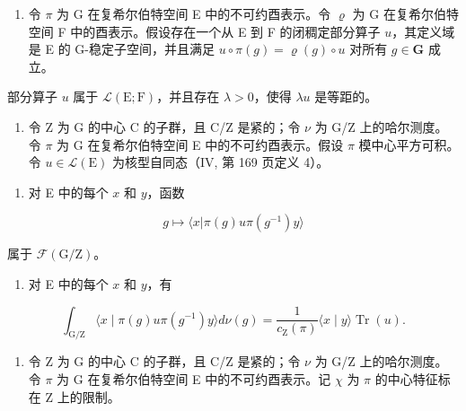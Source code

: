 \begin{enumerate}
\def\labelenumi{\arabic{enumi})}
\setcounter{enumi}{12}
\tightlist
\item
  令 \(\pi\) 为 G 在复希尔伯特空间 E 中的不可约酉表示。令 \(\varrho\) 为 G 在复希尔伯特空间 F 中的酉表示。假设存在一个从 E 到 F 的闭稠定部分算子 \(u\)，其定义域是 E 的 G-稳定子空间，并且满足 \(u \circ \pi(g) = \varrho(g) \circ u\) 对所有 \(g \in \mathbf{G}\) 成立。
\end{enumerate}

部分算子 \(u\) 属于 \(\mathcal{L}(\mathrm{E};\mathrm{F})\)，并且存在 \(\lambda > 0\)，使得 \(\lambda u\) 是等距的。

\begin{enumerate}
\def\labelenumi{\arabic{enumi})}
\setcounter{enumi}{13}
\tightlist
\item
  令 Z 为 G 的中心 C 的子群，且 C/Z 是紧的；令 \(\nu\) 为 G/Z 上的哈尔测度。令 \(\pi\) 为 G 在复希尔伯特空间 E 中的不可约酉表示。假设 \(\pi\) 模中心平方可积。令 \(u \in \mathcal{L}(\mathrm{E})\) 为核型自同态（IV, 第 169 页定义 4）。
\end{enumerate}

\begin{enumerate}
\def\labelenumi{\alph{enumi})}
\tightlist
\item
  对 E 中的每个 \(x\) 和 \(y\)，函数
\end{enumerate}

\[
g \mapsto \langle x | \pi (g) u \pi (g ^ {- 1}) y \rangle
\]

属于 \(\mathcal{F}(\mathrm{G / Z})\)。

\begin{enumerate}
\def\labelenumi{\alph{enumi})}
\setcounter{enumi}{1}
\tightlist
\item
  对 E 中的每个 \(x\) 和 \(y\)，有
\end{enumerate}

\[
\int_ {\mathrm{G} / \mathrm{Z}} \langle x \mid \pi (g) u \pi (g ^ {- 1}) y \rangle d \nu (g) = \frac {1}{c _ {\mathrm{Z}} (\pi)} \langle x \mid y \rangle \operatorname{Tr} (u).
\]

\begin{enumerate}
\def\labelenumi{\arabic{enumi})}
\setcounter{enumi}{14}
\tightlist
\item
  令 Z 为 G 的中心 C 的子群，且 C/Z 是紧的；令 \(\nu\) 为 G/Z 上的哈尔测度。令 \(\pi\) 为 G 在复希尔伯特空间 E 中的不可约酉表示。记 \(\chi\) 为 \(\pi\) 的中心特征标在 Z 上的限制。
\end{enumerate}

